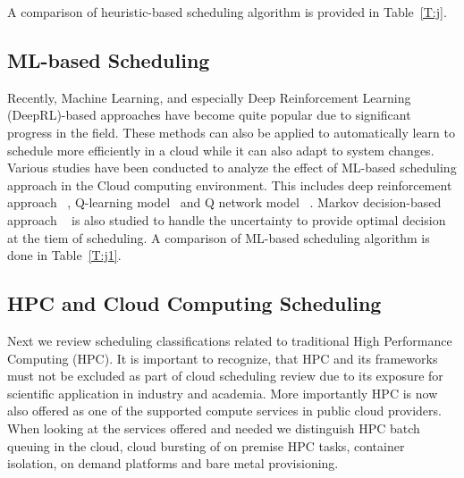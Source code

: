 \documentclass[final,5p,times,twocolumn]{elsarticle}
\begin{document}
A comparison of heuristic-based scheduling
algorithm is provided in  Table~\ref{T:j}.




\subsection{ML-based Scheduling}\label{sec:AI}

Recently, Machine Learning, and especially Deep Reinforcement Learning
(DeepRL)-based approaches have become quite popular due to significant
progress in the field. These methods can also be applied to
automatically learn to schedule more efficiently in a cloud while it
can also adapt to system changes. Various studies have been conducted
to analyze the effect of ML-based scheduling approach in the Cloud
computing environment. This includes deep reinforcement approach
~\cite{cheng2018drl,mao2018learning}, Q-learning
model~\cite{zhang2017energy} and Q network model
~\cite{wang2019multi}. Markov decision-based approach
~\cite{barrett2013applying} is also studied to handle the uncertainty
to provide optimal decision at the tiem of scheduling.  A comparison
of ML-based scheduling algorithm is done in Table~\ref{T:j1}.





\subsection{HPC and Cloud Computing Scheduling}
\label{sec:hpc}


Next we review scheduling classifications related to traditional High
Performance Computing (HPC). It is important to recognize, that HPC
and its frameworks must not be excluded as part of cloud scheduling review
due to its exposure for scientific application in industry and
academia. More importantly HPC is now also offered as one of the supported
compute services in public cloud providers. When looking at the services offered
and needed we distinguish HPC batch queuing in the cloud, cloud
bursting of on premise HPC tasks, container isolation, on demand
platforms and bare metal provisioning.
\end{document}
